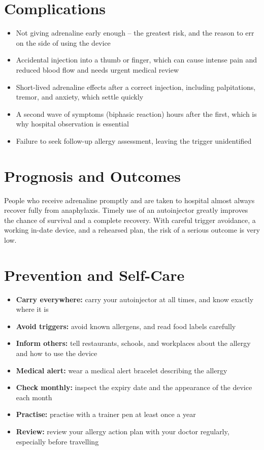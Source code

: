 \section*{Complications}
\begin{itemize}
    \item Not giving adrenaline early enough -- the greatest risk, and the reason to err on the side of using the device
    \item Accidental injection into a thumb or finger, which can cause intense pain and reduced blood flow and needs urgent medical review
    \item Short-lived adrenaline effects after a correct injection, including palpitations, tremor, and anxiety, which settle quickly
    \item A second wave of symptoms (biphasic reaction) hours after the first, which is why hospital observation is essential
    \item Failure to seek follow-up allergy assessment, leaving the trigger unidentified
\end{itemize}

\section*{Prognosis and Outcomes}
People who receive adrenaline promptly and are taken to hospital almost always recover fully from anaphylaxis. Timely use of an autoinjector greatly improves the chance of survival and a complete recovery. With careful trigger avoidance, a working in-date device, and a rehearsed plan, the risk of a serious outcome is very low.

\section*{Prevention and Self-Care}
\begin{itemize}
    \item \textbf{Carry everywhere:} carry your autoinjector at all times, and know exactly where it is
    \item \textbf{Avoid triggers:} avoid known allergens, and read food labels carefully
    \item \textbf{Inform others:} tell restaurants, schools, and workplaces about the allergy and how to use the device
    \item \textbf{Medical alert:} wear a medical alert bracelet describing the allergy
    \item \textbf{Check monthly:} inspect the expiry date and the appearance of the device each month
    \item \textbf{Practise:} practise with a trainer pen at least once a year
    \item \textbf{Review:} review your allergy action plan with your doctor regularly, especially before travelling
\end{itemize}

